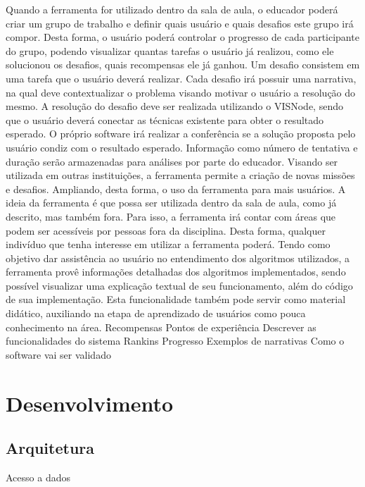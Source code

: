 \documentclass[
	12pt,				%
	oneside,			%
	a4paper,			%
	english,			%
	french,				%
	spanish,			%
	brazil,				%
	]{abntex2}
\begin{document}
	Quando a ferramenta for utilizado dentro da sala de aula, o educador poderá criar um grupo de trabalho e definir quais usuário e quais desafios este grupo irá compor. Desta forma, o usuário poderá controlar o progresso de cada participante do grupo, podendo visualizar quantas tarefas o usuário já realizou, como ele solucionou os desafios, quais recompensas ele já ganhou.
	Um desafio consistem em uma tarefa que o usuário deverá realizar. Cada desafio irá possuir uma narrativa, na qual deve contextualizar o problema visando motivar o usuário a resolução do mesmo.
	A resolução do desafio deve ser realizada utilizando o VISNode, sendo que o usuário deverá conectar as técnicas existente para obter o resultado esperado. O próprio software irá realizar a conferência se a solução proposta pelo usuário condiz com o resultado esperado. Informação como número de tentativa e duração serão armazenadas para análises por parte do educador.
	Visando ser utilizada em outras instituições, a ferramenta permite a criação de novas missões e desafios. Ampliando, desta forma, o uso da ferramenta para mais usuários.
A ideia da ferramenta é que possa ser utilizada dentro da sala de aula, como já descrito, mas também fora. Para isso, a ferramenta irá contar com áreas que podem ser acessíveis por pessoas fora da disciplina. Desta forma, qualquer indivíduo que tenha interesse em utilizar a ferramenta poderá.
Tendo como objetivo dar assistência ao usuário no entendimento dos algoritmos utilizados, a ferramenta provê informações detalhadas dos algoritmos implementados, sendo possível visualizar uma explicação textual de seu funcionamento, além do código de sua implementação. Esta funcionalidade também pode servir como material didático, auxiliando na etapa de aprendizado de usuários como pouca conhecimento na área.
Recompensas
Pontos de experiência
Descrever as funcionalidades do sistema
Rankins
Progresso
Exemplos de narrativas
Como o software vai ser validado

\chapter{Desenvolvimento} 


\section{Arquitetura}
Acesso a dados
\end{document}
